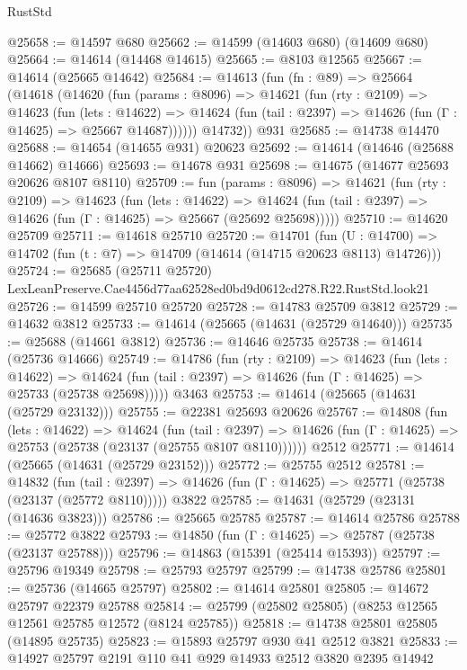 \begin{lexlean}{RustStd}
\begin{coremodule}
@25658 := @14597 @680
@25662 := @14599 (@14603 @680) (@14609 @680)
@25664 := @14614 (@14468 @14615)
@25665 := @8103 @12565
@25667 := @14614 (@25665 @14642)
@25684 := @14613
    (fun (fn : @89) =>
    @25664
      (@14618
        (@14620
          (fun (params : @8096) =>
          @14621
            (fun (rty : @2109) =>
            @14623
              (fun (lets : @14622) =>
              @14624 (fun (tail : @2397) => @14626 (fun (Γ : @14625) => @25667 @14687))))))
        @14732))
    @931
@25685 := @14738 @14470
@25688 := @14654 (@14655 @931) @20623
@25692 := @14614 (@14646 (@25688 @14662) @14666)
@25693 := @14678 @931
@25698 := @14675 (@14677 @25693 @20626 @8107 @8110)
@25709 := fun (params : @8096) =>
  @14621
    (fun (rty : @2109) =>
    @14623
      (fun (lets : @14622) =>
      @14624 (fun (tail : @2397) => @14626 (fun (Γ : @14625) => @25667 (@25692 @25698)))))
@25710 := @14620 @25709
@25711 := @14618 @25710
@25720 := @14701
    (fun (U : @14700) => @14702 (fun (t : @7) => @14709 (@14614 (@14715 @20623 @8113) @14726)))
@25724 := @25685
    (@25711 @25720)
    LexLeanPreserve.Cae4456d77aa62528ed0bd9d0612cd278.R22.RustStd.look21
@25726 := @14599 @25710 @25720
@25728 := @14783 @25709 @3812
@25729 := @14632 @3812
@25733 := @14614 (@25665 (@14631 (@25729 @14640)))
@25735 := @25688 (@14661 @3812)
@25736 := @14646 @25735
@25738 := @14614 (@25736 @14666)
@25749 := @14786
    (fun (rty : @2109) =>
    @14623
      (fun (lets : @14622) =>
      @14624 (fun (tail : @2397) => @14626 (fun (Γ : @14625) => @25733 (@25738 @25698)))))
    @3463
@25753 := @14614 (@25665 (@14631 (@25729 @23132)))
@25755 := @22381 @25693 @20626
@25767 := @14808
    (fun (lets : @14622) =>
    @14624
      (fun (tail : @2397) =>
      @14626 (fun (Γ : @14625) => @25753 (@25738 (@23137 (@25755 @8107 @8110))))))
    @2512
@25771 := @14614 (@25665 (@14631 (@25729 @23152)))
@25772 := @25755 @2512
@25781 := @14832
    (fun (tail : @2397) => @14626 (fun (Γ : @14625) => @25771 (@25738 (@23137 (@25772 @8110)))))
    @3822
@25785 := @14631 (@25729 (@23131 (@14636 @3823)))
@25786 := @25665 @25785
@25787 := @14614 @25786
@25788 := @25772 @3822
@25793 := @14850 (fun (Γ : @14625) => @25787 (@25738 (@23137 @25788)))
@25796 := @14863 (@15391 (@25414 @15393))
@25797 := @25796 @19349
@25798 := @25793 @25797
@25799 := @14738 @25786
@25801 := @25736 (@14665 @25797)
@25802 := @14614 @25801
@25805 := @14672 @25797 @22379 @25788
@25814 := @25799 (@25802 @25805) (@8253 @12565 @12561 @25785 @12572 (@8124 @25785))
@25818 := @14738 @25801 @25805 (@14895 @25735)
@25823 := @15893 @25797 @930 @41 @2512 @3821
@25833 := @14927 @25797 @2191 @110 @41 @929 @14933 @2512 @3820 @2395 @14942

\end{coremodule}
\end{lexlean}
